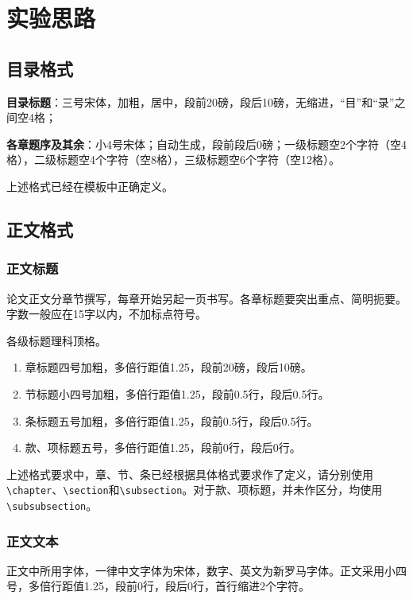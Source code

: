 \chapter{实验思路}

\section{目录格式}

\textbf{目录标题}：三号宋体，加粗，居中，段前20磅，段后10磅，无缩进，“目”和“录”之间空4格；

\textbf{各章题序及其余}：小4号宋体；自动生成，段前段后0磅；一级标题空2个字符（空4格），二级标题空4个字符（空8格），三级标题空6个字符（空12格）。

上述格式已经在模板中正确定义。

\section{正文格式}

\subsection{正文标题}

论文正文分章节撰写，每章开始另起一页书写。各章标题要突出重点、简明扼要。字数一般应在15字以内，不加标点符号。

各级标题理科顶格。

\begin{enumerate}
    \item 章标题四号加粗，多倍行距值1.25，段前20磅，段后10磅。
    \item 节标题小四号加粗，多倍行距值1.25，段前0.5行，段后0.5行。
    \item 条标题五号加粗，多倍行距值1.25，段前0.5行，段后0.5行。
    \item 款、项标题五号，多倍行距值1.25，段前0行，段后0行。
\end{enumerate}

上述格式要求中，章、节、条已经根据具体格式要求作了定义，请分别使用\texttt{\textbackslash chapter}、\texttt{\textbackslash section}和\texttt{\textbackslash subsection}。对于款、项标题，并未作区分，均使用\texttt{\textbackslash subsubsection}。

\subsection{正文文本}

正文中所用字体，一律中文字体为宋体，数字、英文为新罗马字体。正文采用小四号，多倍行距值1.25，段前0行，段后0行，首行缩进2个字符。

